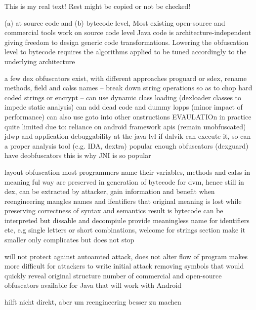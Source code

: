 This is my real text! Rest might be copied or not be checked!

%
(a) at source code and (b) bytecode level, Most existing open-source and commercial tools work on source code level\newline
Java code is architecture-independent giving freedom to design generic code transformations. Lowering the obfuscation level to bytecode requires the algorithms applied to be tuned accordingly to the underlying architecture\newline
\cite{kovachevaMaster}
%

%
a few dex obfuscators exist, with different approaches
proguard or sdex, rename methods, field and calss names -- break down string operations so as to chop hard coded strings or encrypt -- can use dynamic class loading (dexloader classes to impede static analysis)
can add dead code and dummy lopps (minor impact of performance)
can also use goto into other onstructions
EVAULATIOn
in practice quite limited due to:
reliance on android framework apis (remain unobfuscated)
jdwp and application debuggability at the java lvl
if dalvik can execute it, so can a proper analysis tool (e.g. IDA, dextra)
popular enough obfuscators (dexguard) have deobfuscators
this is why JNI is so popular

\cite{andevconDalvikART}
%


%

layout obfuscation
most programmers name their variables, methods and calss in meaning ful way
are preserved in generation of bytecode for dvm, hence still in dex, can be extracted by attacker, gain information and benefit when reengineering
mangles names and ifentifiers that original meaning is lost while preserving correctness of syntax and semantics
result is bytecode can be interpreted but dissable and decompiule provide meaningless name for identifiers etc, e.g single letters or short combinations, welcome for strings section make it smaller
only complicates but does not stop


\cite{munteanLicense}
%

%
will not protect against autoamted attack, does not alter flow of program
makes more difficult for attackers to write initial attack
removing symbols that would quickly reveal original structure
number of commercial and open-source obfuscators available for Java that will work with Android 
\cite{developersSecuring}
%

hilft nicht direkt, aber um reengineering besser zu machen

